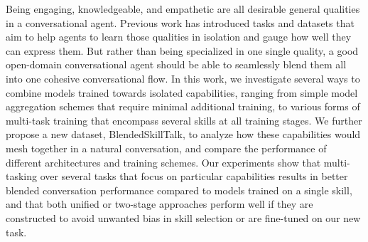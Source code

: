 Being engaging, knowledgeable, and empathetic are all desirable general qualities in a conversational agent. Previous work has introduced tasks and datasets that aim to help agents to learn those qualities in isolation and gauge how well they can express them. But rather than being specialized in one single quality, a good open-domain conversational agent should be able to seamlessly blend them all into one cohesive conversational flow. In this work, we investigate several ways to combine models trained towards isolated capabilities, ranging from simple model aggregation schemes that require minimal additional training, to various forms of multi-task training that encompass several skills at all training stages. We further propose a new dataset, BlendedSkillTalk, to analyze how these capabilities would mesh together in a natural conversation, and compare the performance of different architectures and training schemes. Our experiments show that multi-tasking over several tasks that focus on particular capabilities results in better blended conversation performance compared to models trained on a single skill, and that both unified or two-stage approaches perform well if they are constructed to avoid unwanted bias in skill selection or are fine-tuned on our new task.
